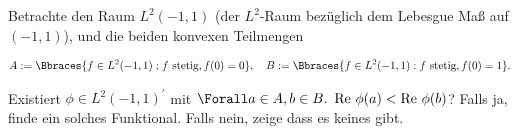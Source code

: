 \begin{exercise}

Betrachte den Raum $L^2(-1, 1)$ (der $L^2$-Raum bezüglich dem Lebesgue Maß auf $(-1, 1)$), und die beiden konvexen Teilmengen

\begin{align*}
  A :=
  \Bbraces{
    f \in L^2(-1, 1):
    f \text{ stetig}, f(0) = 0
  },
  \quad
  B :=
  \Bbraces{
    f \in L^2(-1, 1):
    f \text{ stetig}, f(0) = 1
  }.
\end{align*}

Existiert $\phi \in L^2(-1, 1)^\prime$ mit $\Forall a \in A, b \in B. \enspace \text{Re } \phi(a) < \text{Re } \phi(b)$?
Falls ja, finde ein solches Funktional.
Falls nein, zeige dass es keines gibt.

\end{exercise}

